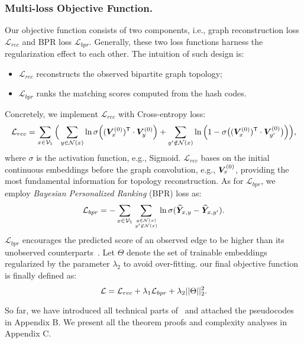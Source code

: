 \subsubsection{\textbf{Multi-loss Objective Function.}}
Our objective function consists of two components, i.e., graph reconstruction loss $\mathcal{L}_{rec}$ and BPR loss $\mathcal{L}_{bpr}$. 
Generally, these two loss functions harness the regularization effect to each other.
The intuition of such design is: 
\begin{itemize}[leftmargin=*]
\item $\mathcal{L}_{rec}$ reconstructs the observed bipartite graph topology;
\item $\mathcal{L}_{bpr}$ ranks the matching scores computed from the hash codes. 
\end{itemize}
Concretely, we implement $\mathcal{L}_{rec}$ with Cross-entropy loss:  
\begin{equation}
\label{eq:rec}
\setlength\abovedisplayskip{2pt}
\setlength\belowdisplayskip{2pt}
\resizebox{1\linewidth}{!}{$
\displaystyle
\mathcal{L}_{rec} = \sum_{x \in \mathcal{V}_1} \Big(\sum_{y\in \mathcal{N}(x)} \ln\sigma\Big(({\emb{V}}^{(0)}_x)^\mathsf{T} \cdot {\emb{V}}^{(0)}_y\Big) + \sum_{y' \notin \mathcal{N}(x)}\ln\Big(1-\sigma\big(({\emb{V}}^{(0)}_x)^\mathsf{T} \cdot {\emb{V}}^{(0)}_{y'}\big)\Big)\Big),
$}
\end{equation}
where $\sigma$ is the activation function, e.g., Sigmoid.
$\mathcal{L}_{rec}$ bases on the initial continuous embeddings before the graph convolution, e.g., {\small${\boldsymbol{V}}^{(0)}_x$}, providing the most fundamental information for topology reconstruction.
As for $\mathcal{L}_{bpr}$, we employ \textit{Bayesian Personalized Ranking} (BPR) loss as:
\begin{equation}
\setlength\abovedisplayskip{2pt}
\setlength\belowdisplayskip{2pt}
\label{eq:hd-bpr}
\mathcal{L}_{bpr} = -\sum_{x \in \mathcal{V}_1} \sum_{\tiny y\in \mathcal{N}(x) \atop y'\notin \mathcal{N}(x)} \ln \sigma(\widehat{\emb{Y}}_{x,y} - \widehat{\emb{Y}}_{x,y'}).
\end{equation}
$\mathcal{L}_{bpr}$ encourages the predicted score of an observed edge to be higher than its unobserved counterparts~\cite{lightgcn}.
Let $\Theta$ denote the set of trainable embeddings regularized by the parameter $\lambda_2$ to avoid over-fitting.
our final objective function is finally defined as:
\begin{equation}
\label{eq:L}
\setlength\abovedisplayskip{2pt}
\setlength\belowdisplayskip{2pt}
\mathcal{L} = \mathcal{L}_{rec} + \lambda_1\mathcal{L}_{bpr} + \lambda_2 ||\Theta||_2^2.
\end{equation} 


So far, we have introduced all technical parts of \model~and attached the pseudocodes in Appendix B.
We present all the theorem proofs and complexity analyses in Appendix C.